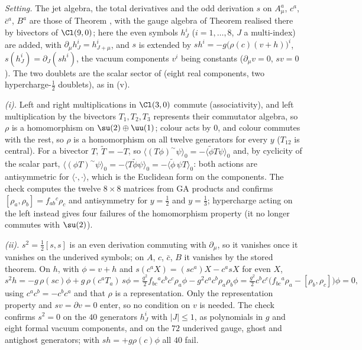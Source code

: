 \emph{Setting.} The jet algebra, the total derivatives and the odd derivation $s$ on $A^{a}_{\mu}$, $c^{a}$, $\bar c^{a}$, $B^{a}$ are those of Theorem , with the gauge algebra of Theorem  realised there by bivectors of $\Cl(9,0)$; here the even symbols $h^{i}_{J}$ ($i = 1, \dots, 8$, $J$ a multi-index) are added, with $\partial_\mu h^{i}_{J} = h^{i}_{J+\mu}$, and $s$ is extended by $s h^{i} = -g\big(\rho(c)(v + h)\big)^{i}$, $s(h^{i}_{J}) = \partial_{J}(sh^{i})$, the vacuum components $v^{i}$ being constants ($\partial_\mu v = 0$, $sv = 0$). The two doublets are the scalar sector of  (eight real components, two hypercharge-$\tfrac12$ doublets), as in (v).

\emph{(i).} Left and right multiplications in $\Cl(3,0)$ commute (associativity), and left multiplication by the bivectors $T_{1}, T_{2}, T_{3}$ represents their commutator algebra, so $\rho$ is a homomorphism on $\su(2) \oplus \uu(1)$; colour acts by $0$, and colour commutes with the rest, so $\rho$ is a homomorphism on all twelve generators for every $y$ ($T_{12}$ is central). For a bivector $T$, $\widetilde{T} = -T$, so $\langle(T\phi)^{\sim}\psi\rangle_{0} = -\langle\widetilde{\phi}T\psi\rangle_{0}$ and, by cyclicity of the scalar part, $\langle(\phi T)^{\sim}\psi\rangle_{0} = -\langle T\widetilde{\phi}\psi\rangle_{0} = -\langle\widetilde{\phi}\,\psi T\rangle_{0}$: both actions are antisymmetric for $\langle\cdot,\cdot\rangle$, which is the Euclidean form on the components. The check computes the twelve $8 \times 8$ matrices from GA products and confirms $[\rho_{a}, \rho_{b}] = f_{ab}{}^{c}\rho_{c}$ and antisymmetry for $y = \tfrac12$ and $y = \tfrac13$; hypercharge acting on the left instead gives four failures of the homomorphism property (it no longer commutes with $\su(2)$).

\emph{(ii).} $s^{2} = \tfrac12[s, s]$ is an even derivation commuting with $\partial_\mu$, so it vanishes once it vanishes on the underived symbols; on $A$, $c$, $\bar c$, $B$ it vanishes by the stored theorem. On $h$, with $\phi = v + h$ and $s(c^{a}X) = (sc^{a})X - c^{a}sX$ for even $X$,
\[
s^{2}h = -g\,\rho(sc)\phi + g\,\rho(c^{a}T_{a})\,s\phi = \tfrac{g^{2}}{2}f_{bc}{}^{a}c^{b}c^{c}\rho_{a}\phi - g^{2}c^{a}c^{b}\rho_{a}\rho_{b}\phi = \tfrac{g^{2}}{2}c^{b}c^{c}\big(f_{bc}{}^{a}\rho_{a} - [\rho_{b}, \rho_{c}]\big)\phi = 0,
\]
using $c^{a}c^{b} = -c^{b}c^{a}$ and that $\rho$ is a representation. Only the representation property and $sv = \partial v = 0$ enter, so no condition on $v$ is needed. The check confirms $s^{2} = 0$ on the $40$ generators $h^{i}_{J}$ with $|J| \le 1$, as polynomials in $g$ and eight formal vacuum components, and on the $72$ underived gauge, ghost and antighost generators; with $sh = +g\rho(c)\phi$ all $40$ fail.

